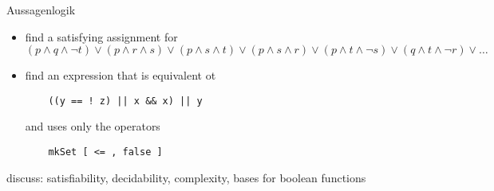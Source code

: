\begin{slide}{Aussagenlogik}

\begin{itemize}
\item
find a satisfying assignment for
$(p\wedge q\wedge \neg t)\vee(p \wedge r\wedge s)
\vee(p\wedge s\wedge t)\vee(p\wedge s\wedge r)
\vee(p \wedge t\wedge\neg s)\vee(q\wedge t\wedge \neg r)\vee \dots$

\item
find an expression that is equivalent ot
\begin{verbatim}
    ((y == ! z) || x && x) || y
\end{verbatim}
and uses only the operators
\begin{verbatim}
    mkSet [ <= , false ]
\end{verbatim}
\end{itemize}

discuss: satisfiability, decidability, complexity,
bases for boolean functions

\end{slide}
